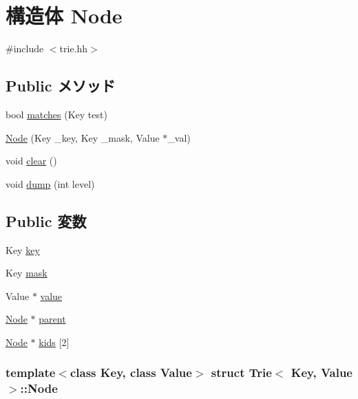 \hypertarget{structTrie_1_1Node}{
\section{構造体 Node}
\label{structTrie_1_1Node}
}


{\ttfamily \#include $<$trie.hh$>$}\subsection*{Public メソッド}
\begin{DoxyCompactItemize}
\item 
bool \hyperlink{structTrie_1_1Node_a448e0793acbfb602b919b40a8ab34c99}{matches} (Key test)
\item 
\hyperlink{structTrie_1_1Node_ae9a54cd4b88d09a6cb8f8766baf192c2}{Node} (Key \_\-key, Key \_\-mask, Value $\ast$\_\-val)
\item 
void \hyperlink{structTrie_1_1Node_ac8bb3912a3ce86b15842e79d0b421204}{clear} ()
\item 
void \hyperlink{structTrie_1_1Node_a37b6acc1c1c83ccaa599ef989d0d5e79}{dump} (int level)
\end{DoxyCompactItemize}
\subsection*{Public 変数}
\begin{DoxyCompactItemize}
\item 
Key \hyperlink{structTrie_1_1Node_a96313403719d705d2df812e3ba166772}{key}
\item 
Key \hyperlink{structTrie_1_1Node_a5ca6e07c7cb150b1a672223c95c938aa}{mask}
\item 
Value $\ast$ \hyperlink{structTrie_1_1Node_a7301da3d23cb556368f4a728d6e9b0ef}{value}
\item 
\hyperlink{structTrie_1_1Node}{Node} $\ast$ \hyperlink{structTrie_1_1Node_a15358e51f4bc699859aef344484ae4a8}{parent}
\item 
\hyperlink{structTrie_1_1Node}{Node} $\ast$ \hyperlink{structTrie_1_1Node_a9351f8f627482f6964ee897bf446de87}{kids} \mbox{[}2\mbox{]}
\end{DoxyCompactItemize}
\subsubsection*{template$<$class Key, class Value$>$ struct Trie$<$ Key, Value $>$::Node}



